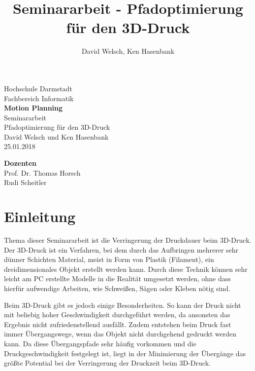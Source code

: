 \documentclass[12pt, a4paper]{article}
\begin{document}
\author{David Welsch, Ken Hasenbank}
\title{Seminararbeit - Pfadoptimierung für den 3D-Druck}

\makeatother

\makeatletter
\begin{titlepage}
 \begin{center}
  {\LARGE Hochschule Darmstadt}\\
  {\large Fachbereich Informatik \\[3.5cm]}
	{\huge\bf Motion Planning}\\[0.8cm]
  {\LARGE Seminararbeit\\Pfadoptimierung für den 3D-Druck\\[3.5cm]}
 {\large David Welsch und Ken Hasenbank}\\[0.5cm]
25.01.2018\\[3cm]
\begin{center}
{\large\bf Dozenten}\\[0.6cm]
  {\large Prof. Dr. Thomas Horsch}\\[0.2cm]
  {\large Rudi Scheitler}
\end{center}
\end{center}
\end{titlepage}
\makeatother


\newpage
\tableofcontents

\newpage
\ofoot{\thepage}
\setcounter{page}{1}

\section{Einleitung}

Thema dieser Seminararbeit ist die Verringerung der Druckdauer beim 3D-Druck. Der 3D-Druck ist ein Verfahren, bei dem durch das Aufbringen mehrerer sehr dünner Schichten Material, meist in Form von Plastik (Filament), ein dreidimensionales Objekt erstellt werden kann. Durch diese Technik können sehr leicht am PC erstellte Modelle in die Realität umgesetzt werden, ohne dass hierfür aufwendige Arbeiten, wie Schweißen, Sägen oder Kleben nötig sind.

Beim 3D-Druck gibt es jedoch einige Besonderheiten. So kann der Druck nicht mit beliebig hoher Geschwindigkeit durchgeführt werden, da ansonsten das Ergebnis nicht zufriedenstellend ausfällt. Zudem entstehen beim Druck fast immer Übergangswege, wenn das Objekt nicht durchgehend gedruckt werden kann. Da diese Übergangspfade sehr häufig vorkommen und die Druckgeschwindigkeit festgelegt ist, liegt in der Minimierung der Übergänge das größte Potential bei der Verringerung der Druckzeit beim 3D-Druck.
\end{document}
